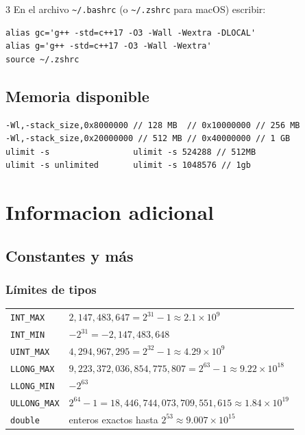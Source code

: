 \documentclass[8pt, spanish, mexico, letterpaper]{extarticle}
\newcommand{\<}{<}
\begin{document}
\begin{multicols*}{3}
En el archivo \texttt{\textasciitilde/.bashrc} (o \texttt{\textasciitilde/.zshrc} para macOS) escribir:
\begin{verbatim}
alias gc='g++ -std=c++17 -O3 -Wall -Wextra -DLOCAL'
alias g='g++ -std=c++17 -O3 -Wall -Wextra'
source ~/.zshrc
\end{verbatim}

\subsection{Memoria disponible}

\begin{verbatim} 
-Wl,-stack_size,0x8000000 // 128 MB  // 0x10000000 // 256 MB
-Wl,-stack_size,0x20000000 // 512 MB // 0x40000000 // 1 GB 
ulimit -s                 ulimit -s 524288 // 512MB 
ulimit -s unlimited       ulimit -s 1048576 // 1gb
\end{verbatim}



\section{Informacion adicional}

\subsection*{Constantes y más}

\subsubsection*{Límites de tipos}
\begin{tabular}{ll}
\texttt{INT\_MAX} & \(2{,}147{,}483{,}647 = 2^{31}-1 \approx 2.1\times10^{9}\)\\
\texttt{INT\_MIN} & \(-2^{31} = -2{,}147{,}483{,}648\)\\
\texttt{UINT\_MAX} & \(4{,}294{,}967{,}295 = 2^{32}-1 \approx 4.29\times10^{9}\)\\
\texttt{LLONG\_MAX} & \(9{,}223{,}372{,}036{,}854{,}775{,}807 = 2^{63}-1 \approx 9.22\times10^{18}\)\\
\texttt{LLONG\_MIN} & \(-2^{63}\)\\
\texttt{ULLONG\_MAX} & \(2^{64}-1 = 18{,}446{,}744{,}073{,}709{,}551{,}615 \approx 1.84\times10^{19}\)\\
\texttt{double} & enteros exactos hasta \(2^{53} \approx 9.007\times10^{15}\)\\
\end{tabular}


\end{multicols*}
\end{document}
